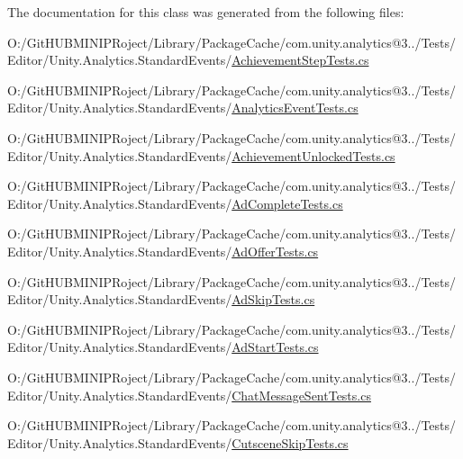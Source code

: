 The documentation for this class was generated from the following files\+:\begin{DoxyCompactItemize}
\item 
O\+:/\+Git\+H\+U\+B\+M\+I\+N\+I\+P\+Roject/\+Library/\+Package\+Cache/com.\+unity.\+analytics@3../\+Tests/\+Editor/\+Unity.\+Analytics.\+Standard\+Events/\mbox{\hyperlink{_achievement_step_tests_8cs}{Achievement\+Step\+Tests.\+cs}}\item 
O\+:/\+Git\+H\+U\+B\+M\+I\+N\+I\+P\+Roject/\+Library/\+Package\+Cache/com.\+unity.\+analytics@3../\+Tests/\+Editor/\+Unity.\+Analytics.\+Standard\+Events/\mbox{\hyperlink{_analytics_event_tests_8cs}{Analytics\+Event\+Tests.\+cs}}\item 
O\+:/\+Git\+H\+U\+B\+M\+I\+N\+I\+P\+Roject/\+Library/\+Package\+Cache/com.\+unity.\+analytics@3../\+Tests/\+Editor/\+Unity.\+Analytics.\+Standard\+Events/\mbox{\hyperlink{_achievement_unlocked_tests_8cs}{Achievement\+Unlocked\+Tests.\+cs}}\item 
O\+:/\+Git\+H\+U\+B\+M\+I\+N\+I\+P\+Roject/\+Library/\+Package\+Cache/com.\+unity.\+analytics@3../\+Tests/\+Editor/\+Unity.\+Analytics.\+Standard\+Events/\mbox{\hyperlink{_ad_complete_tests_8cs}{Ad\+Complete\+Tests.\+cs}}\item 
O\+:/\+Git\+H\+U\+B\+M\+I\+N\+I\+P\+Roject/\+Library/\+Package\+Cache/com.\+unity.\+analytics@3../\+Tests/\+Editor/\+Unity.\+Analytics.\+Standard\+Events/\mbox{\hyperlink{_ad_offer_tests_8cs}{Ad\+Offer\+Tests.\+cs}}\item 
O\+:/\+Git\+H\+U\+B\+M\+I\+N\+I\+P\+Roject/\+Library/\+Package\+Cache/com.\+unity.\+analytics@3../\+Tests/\+Editor/\+Unity.\+Analytics.\+Standard\+Events/\mbox{\hyperlink{_ad_skip_tests_8cs}{Ad\+Skip\+Tests.\+cs}}\item 
O\+:/\+Git\+H\+U\+B\+M\+I\+N\+I\+P\+Roject/\+Library/\+Package\+Cache/com.\+unity.\+analytics@3../\+Tests/\+Editor/\+Unity.\+Analytics.\+Standard\+Events/\mbox{\hyperlink{_ad_start_tests_8cs}{Ad\+Start\+Tests.\+cs}}\item 
O\+:/\+Git\+H\+U\+B\+M\+I\+N\+I\+P\+Roject/\+Library/\+Package\+Cache/com.\+unity.\+analytics@3../\+Tests/\+Editor/\+Unity.\+Analytics.\+Standard\+Events/\mbox{\hyperlink{_chat_message_sent_tests_8cs}{Chat\+Message\+Sent\+Tests.\+cs}}\item 
O\+:/\+Git\+H\+U\+B\+M\+I\+N\+I\+P\+Roject/\+Library/\+Package\+Cache/com.\+unity.\+analytics@3../\+Tests/\+Editor/\+Unity.\+Analytics.\+Standard\+Events/\mbox{\hyperlink{_cutscene_skip_tests_8cs}{Cutscene\+Skip\+Tests.\+cs}}\item 

\end{DoxyCompactItemize}
